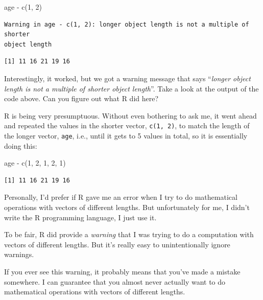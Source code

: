 \documentclass[
  letterpaper,
  DIV=11,
  numbers=noendperiod]{scrreprt}
\newenvironment{Shaded}{\begin{snugshade}}{\end{snugshade}}
\newcommand{\DecValTok}[1]{\textcolor[rgb]{0.68,0.00,0.00}{#1}}
\newcommand{\FunctionTok}[1]{\textcolor[rgb]{0.28,0.35,0.67}{#1}}
\newcommand{\NormalTok}[1]{\textcolor[rgb]{0.00,0.23,0.31}{#1}}
\newcommand{\SpecialCharTok}[1]{\textcolor[rgb]{0.37,0.37,0.37}{#1}}
\begin{document}
\begin{Shaded}
\begin{Highlighting}[]
\NormalTok{age }\SpecialCharTok{{-}} \FunctionTok{c}\NormalTok{(}\DecValTok{1}\NormalTok{, }\DecValTok{2}\NormalTok{)}
\end{Highlighting}
\end{Shaded}

\begin{verbatim}
Warning in age - c(1, 2): longer object length is not a multiple of shorter
object length
\end{verbatim}

\begin{verbatim}
[1] 11 16 21 19 16
\end{verbatim}

Interestingly, it worked, but we got a warning message that says
``\emph{longer object length is not a multiple of shorter object
length}''. Take a look at the output of the code above. Can you figure
out what R did here?

R is being very presumptuous. Without even bothering to ask me, it went
ahead and repeated the values in the shorter vector, \texttt{c(1,\ 2)},
to match the length of the longer vector, \texttt{age}, i.e., until it
gets to 5 values in total, so it is essentially doing this:

\begin{Shaded}
\begin{Highlighting}[]
\NormalTok{age }\SpecialCharTok{{-}} \FunctionTok{c}\NormalTok{(}\DecValTok{1}\NormalTok{, }\DecValTok{2}\NormalTok{, }\DecValTok{1}\NormalTok{, }\DecValTok{2}\NormalTok{, }\DecValTok{1}\NormalTok{)}
\end{Highlighting}
\end{Shaded}

\begin{verbatim}
[1] 11 16 21 19 16
\end{verbatim}

Personally, I'd prefer if R gave me an error when I try to do
mathematical operations with vectors of different lengths. But
unfortunately for me, I didn't write the R programming language, I just
use it.

To be fair, R did provide a \emph{warning} that I was trying to do a
computation with vectors of different lengths. But it's really easy to
unintentionally ignore warnings.

If you ever see this warning, it probably means that you've made a
mistake somewhere. I can guarantee that you almost never actually want
to do mathematical operations with vectors of different lengths.
\end{document}
